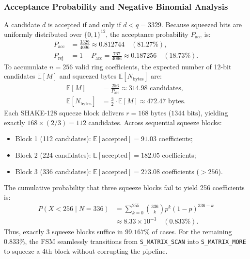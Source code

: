 \subsubsection{Acceptance Probability and Negative Binomial Analysis}
A candidate $d$ is accepted if and only if $d < q = 3329$. Because squeezed bits are uniformly distributed over $\{0, 1\}^{12}$, the acceptance probability $P_{\text{acc}}$ is:
\begin{align}
P_{\text{acc}} &= \frac{3329}{4096} \approx 0.812744 \quad (81.27\%), \label{eq:rejection_prob} \\
P_{\text{rej}} &= 1 - P_{\text{acc}} = \frac{767}{4096} \approx 0.187256 \quad (18.73\%). \nonumber
\end{align}
To accumulate $n = 256$ valid ring coefficients, the expected number of 12-bit candidates $\mathbb{E}[M]$ and squeezed bytes $\mathbb{E}[N_{\text{bytes}}]$ are:
\begin{align}
\mathbb{E}[M] &= \frac{256}{P_{\text{acc}}} \approx 314.98\text{ candidates}, \label{eq:expected_candidates} \\
\mathbb{E}[N_{\text{bytes}}] &= \frac{3}{2} \cdot \mathbb{E}[M] \approx 472.47\text{ bytes}. \nonumber
\end{align}
Each SHAKE-128 squeeze block delivers $r = 168\text{ bytes}$ ($1344\text{ bits}$), yielding exactly $168 \times (2/3) = 112$ candidates. Across sequential squeeze blocks:
\begin{itemize}
    \item Block 1 (112 candidates): $\mathbb{E}[\text{accepted}] = 91.03$ coefficients;
    \item Block 2 (224 candidates): $\mathbb{E}[\text{accepted}] = 182.05$ coefficients;
    \item Block 3 (336 candidates): $\mathbb{E}[\text{accepted}] = 273.08$ coefficients ($> 256$).
\end{itemize}
The cumulative probability that three squeeze blocks fail to yield 256 coefficients is:
\begin{equation}
\begin{aligned}
P(X < 256 \mid N=336) &= \sum_{k=0}^{255} \binom{336}{k} p^k (1-p)^{336-k} \\
&\approx 8.33 \times 10^{-3} \quad (0.833\%).
\end{aligned}
\label{eq:cumulative_binomial}
\end{equation}
Thus, exactly 3 squeeze blocks suffice in $99.167\%$ of cases. For the remaining $0.833\%$, the FSM seamlessly transitions from \texttt{S\_MATRIX\_SCAN} into \texttt{S\_MATRIX\_MORE} to squeeze a 4th block without corrupting the pipeline.

